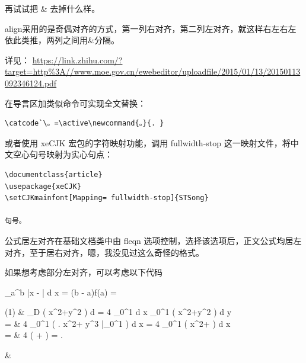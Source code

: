 再试试把 \& 去掉什么样。

align采用的是奇偶对齐的方式，第一列右对齐，第二列左对齐，就这样右左右左依此类推，两列之间用\&分隔。



详见：
\url{https://link.zhihu.com/?target=http\%3A//www.moe.gov.cn/ewebeditor/uploadfile/2015/01/13/20150113092346124.pdf}

在导言区加类似命令可实现全文替换：

\begin{verbatim}
\catcode`\。=\active\newcommand{。}{. }
\end{verbatim}

或者使用 xeCJK 宏包的字符映射功能，调用 fullwidth-stop
这一映射文件，将中文空心句号映射为实心句点：

\begin{verbatim}
\documentclass{article}
\usepackage{xeCJK}
\setCJKmainfont[Mapping= fullwidth-stop]{STSong}

句号。

\end{verbatim}



公式居左对齐在基础文档类中由 fleqn
选项控制，选择该选项后，正文公式均居左对齐，至于居右对齐，嗯，我没见过这么奇怪的格式。

如果想考虑部分左对齐，可以考虑以下代码
\begin{texcode}
\begin{flalign}
  \int_a^b {\left|x - \right|} d x
  = (b - a)f(a)
  = 
\end{flalign}
\end{texcode}
\begin{texcode}
\begin{flalign*}
  \begin{split}
    (1) & \displaystyle\iint \limits_D \left( x^2+y^2 \right) d \sigma
    = 4 \int_0^1 d x \int_0^1 \left( x^2+y^2 \right) d y \\
    = & 4 \int_0^1 \left( \left. x^2+ y^3 \right|_0^1 \right) d x
    = 4 \int_0^1 \left( x^2+ \right) d x \\
    = & 4 \times \left( + \right)
    = .
  \end{split}&
\end{flalign*}
\end{texcode}


